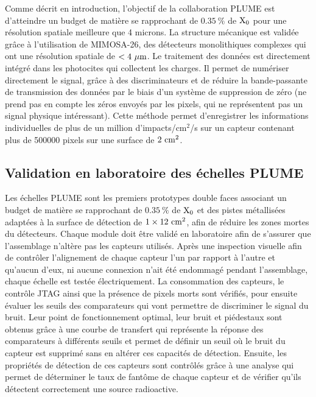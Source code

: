     Comme décrit en introduction, l'objectif de la collaboration PLUME est d'atteindre un budget de matière se rapprochant de $0.35~\%$ de $\rm{X_0}$ pour une résolution spatiale meilleure que 4 microns.
  La structure mécanique est validée grâce à l'utilisation de MIMOSA-26, des détecteurs monolithiques complexes qui ont une résolution spatiale de $< 4~\mu\rm{m}$.
  Le traitement des données est directement intégré dans les photocites qui collectent les charges. 
  Il permet de numériser directement le signal, grâce à des discriminateurs et de réduire la bande-passante de transmission des données par le biais d'un système de suppression de zéro (ne prend pas en compte les zéros envoyés par les pixels, qui ne représentent pas un signal physique intéressant).
  Cette méthode permet d'enregistrer les informations individuelles de plus de un million d'impacts/cm$^2$/s sur un capteur contenant plus de 500000 pixels sur une surface de $2~\rm{cm}^2$.
  
   \subsection{Validation en laboratoire des échelles PLUME}

  Les échelles PLUME sont les premiers prototypes double faces associant un budget de matière se rapprochant de $0.35~\%$ de $\rm{X_0}$ et des pistes métallisées adaptées à la surface de détection de $1 \times 12~\rm{cm}^2$, afin de réduire les zones mortes du détecteurs. 
  Chaque module doit être validé en laboratoire afin de s'assurer que l'assemblage n'altère pas les capteurs utilisés.
  Après une inspection visuelle afin de contrôler l'alignement de chaque capteur l'un par rapport à l'autre et qu'aucun d'eux, ni aucune connexion n'ait été endommagé pendant l'assemblage, chaque échelle est testée électriquement.
  La consommation des capteurs, le contrôle JTAG ainsi que la présence de pixels morts sont vérifiés, pour ensuite évaluer les seuils des comparateurs qui vont permettre de discriminer le signal du bruit.
  Leur point de fonctionnement optimal, leur bruit et piédestaux sont obtenus grâce à une courbe de transfert qui représente la réponse des comparateurs à différents seuils et permet de définir un seuil où le bruit du capteur est supprimé sans en altérer ces capacités de détection.
  Ensuite, les propriétés de détection de ces capteurs sont contrôlés grâce à une analyse qui permet de déterminer le taux de fantôme de chaque capteur et de vérifier qu'ils détectent correctement une source radioactive.
  
